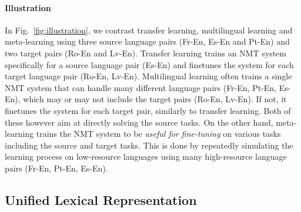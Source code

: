 \paragraph{Illustration}

In Fig.~\ref{fig:illustration}, we contrast transfer learning, multilingual learning and meta-learning using three source language pairs (Fr-En, Es-En and Pt-En) and two target pairs (Ro-En and Lv-En). Transfer learning trains an NMT system specifically for a source language pair (Es-En) and finetunes the system for each target language pair (Ro-En, Lv-En). Multilingual learning often trains a single NMT system that can handle many different language pairs (Fr-En, Pt-En, Es-En), which may or may not include the target pairs (Ro-En, Lv-En). If not, it finetunes the system for each target pair, similarly to transfer learning. Both of these however aim at directly solving the source tasks. On the other hand, meta-learning trains the NMT system to be {\it useful for fine-tuning} on various tasks including the source and target tasks. This is done by repeatedly simulating the learning process on low-resource languages using many high-resource language pairs (Fr-En, Pt-En, Es-En). 






\subsection{Unified Lexical Representation}%
\label{sec:ulr}


